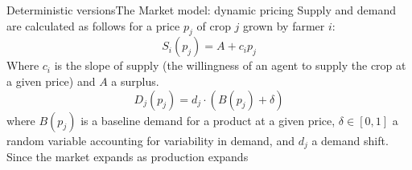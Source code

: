 \documentclass[10pt, aspectratio=169]{beamer}
\def\aa{Deterministic versions}
\def\aac{The Market model: dynamic pricing}
\begin{document}
\begin{frame}{\aa}{\aac}
    Supply and demand are calculated as follows for a price $p_j$ of crop $j$ grown by farmer $i$:\\
    \begin{equation}
        S_i(p_j) = A + c_i p_j
    \end{equation}
    Where $c_i$ is the slope of supply (the willingness of an agent to supply the crop at a given price) and $A$ a surplus.
    \begin{equation}
    D_j(p_j) = d_j \cdot \left( B(p_j) + \delta \right)
    \end{equation}
    where $B(p_j)$ is a baseline demand for a product at a given price, $\delta \in [0,1]$ a random variable accounting for variability in demand, and $d_j$ a demand shift.\\
    Since the market expands as production expands
\end{frame}

\end{document}
